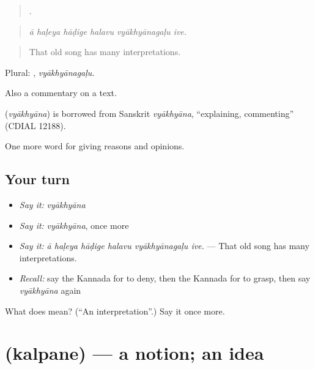 \begin{quote}
     .
\end{quote}

\begin{quote}
\emph{ā haḷeya hāḍige halavu vyākhyānagaḷu ive.}
\end{quote}

\begin{quote}
That old song has many interpretations.
\end{quote}

Plural: , \emph{vyākhyānagaḷu}.

Also a commentary on a text.

\begin{cousinweb}
\textbf{} (\emph{vyākhyāna}) is borrowed from Sanskrit \emph{vyākhyāna}, \textquotedblleft{}explaining, commenting\textquotedblright{} (CDIAL 12188).
\end{cousinweb}

\begin{grammarlens}[title={What you've built}]
One more word for giving reasons and opinions.
\end{grammarlens}

\subsection*{Your turn}
\begin{itemize}
\raggedright
  \item \emph{Say it:} \emph{vyākhyāna}
  \item \emph{Say it:} \emph{vyākhyāna}, once more
  \item \emph{Say it:} \emph{ā haḷeya hāḍige halavu vyākhyānagaḷu ive.} — That old song has many interpretations.
  \item \emph{Recall:} say the Kannada for to deny, then the Kannada for to grasp, then say \emph{vyākhyāna} again
\end{itemize}

\begin{tcolorbox}[breakable,colback=teal!4,colframe=teal!35!black,title={Before you move on}]
What does  mean? (\textquotedblleft{}An interpretation\textquotedblright{}.) Say it once more.
\end{tcolorbox}
\section[\texorpdfstring{\kn{ಕಲ್ಪನೆ} (kalpane)}{ಕಲ್ಪನೆ (kalpane)}]{ (kalpane) — a notion; an idea}

